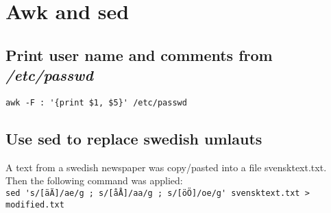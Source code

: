 \documentclass[a4paper,11pt,twoside]{article}
\begin{document}
\section{Awk and sed}
\subsection {Print user name and comments from \textit{/etc/passwd}}
\verb+awk -F : '{print $1, $5}' /etc/passwd+
\subsection {Use sed to replace swedish umlauts}
A text from a swedish newspaper was copy/pasted into a file svensktext.txt. Then the following command was applied: \\
\verb+sed 's/[äÄ]/ae/g ; s/[åÅ]/aa/g ; s/[öÖ]/oe/g' svensktext.txt > modified.txt+

%
\end{document}

